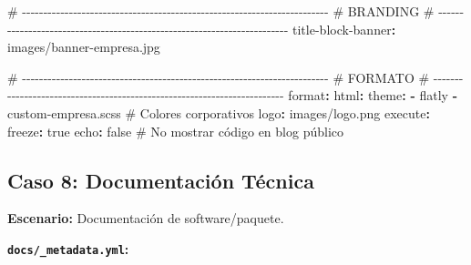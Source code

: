 \documentclass[
  doc,
  floatsintext,
  longtable,
  a4paper,
  nolmodern,
  notxfonts,
  notimes,
  12pt,
  colorlinks=true,linkcolor=blue,citecolor=blue,urlcolor=blue]{apa7}
\newenvironment{Shaded}{\begin{snugshade}}{\end{snugshade}}
\newcommand{\AttributeTok}[1]{\textcolor[rgb]{0.40,0.45,0.13}{#1}}
\newcommand{\CharTok}[1]{\textcolor[rgb]{0.13,0.47,0.30}{#1}}
\newcommand{\CommentTok}[1]{\textcolor[rgb]{0.37,0.37,0.37}{#1}}
\newcommand{\FunctionTok}[1]{\textcolor[rgb]{0.28,0.35,0.67}{#1}}
\newcommand{\KeywordTok}[1]{\textcolor[rgb]{0.00,0.23,0.31}{\textbf{#1}}}
\begin{document}
\begin{Shaded}
\begin{Highlighting}[]
\CommentTok{\# {-}{-}{-}{-}{-}{-}{-}{-}{-}{-}{-}{-}{-}{-}{-}{-}{-}{-}{-}{-}{-}{-}{-}{-}{-}{-}{-}{-}{-}{-}{-}{-}{-}{-}{-}{-}{-}{-}{-}{-}{-}{-}{-}{-}{-}{-}{-}{-}{-}{-}{-}{-}{-}{-}{-}{-}{-}{-}{-}{-}{-}{-}{-}{-}{-}{-}{-}{-}{-}{-}{-}{-}}
\CommentTok{\# BRANDING}
\CommentTok{\# {-}{-}{-}{-}{-}{-}{-}{-}{-}{-}{-}{-}{-}{-}{-}{-}{-}{-}{-}{-}{-}{-}{-}{-}{-}{-}{-}{-}{-}{-}{-}{-}{-}{-}{-}{-}{-}{-}{-}{-}{-}{-}{-}{-}{-}{-}{-}{-}{-}{-}{-}{-}{-}{-}{-}{-}{-}{-}{-}{-}{-}{-}{-}{-}{-}{-}{-}{-}{-}{-}{-}{-}}
\FunctionTok{title{-}block{-}banner}\KeywordTok{:}\AttributeTok{ images/banner{-}empresa.jpg}

\CommentTok{\# {-}{-}{-}{-}{-}{-}{-}{-}{-}{-}{-}{-}{-}{-}{-}{-}{-}{-}{-}{-}{-}{-}{-}{-}{-}{-}{-}{-}{-}{-}{-}{-}{-}{-}{-}{-}{-}{-}{-}{-}{-}{-}{-}{-}{-}{-}{-}{-}{-}{-}{-}{-}{-}{-}{-}{-}{-}{-}{-}{-}{-}{-}{-}{-}{-}{-}{-}{-}{-}{-}{-}{-}}
\CommentTok{\# FORMATO}
\CommentTok{\# {-}{-}{-}{-}{-}{-}{-}{-}{-}{-}{-}{-}{-}{-}{-}{-}{-}{-}{-}{-}{-}{-}{-}{-}{-}{-}{-}{-}{-}{-}{-}{-}{-}{-}{-}{-}{-}{-}{-}{-}{-}{-}{-}{-}{-}{-}{-}{-}{-}{-}{-}{-}{-}{-}{-}{-}{-}{-}{-}{-}{-}{-}{-}{-}{-}{-}{-}{-}{-}{-}{-}{-}}
\FunctionTok{format}\KeywordTok{:}
\AttributeTok{  }\FunctionTok{html}\KeywordTok{:}
\AttributeTok{    }\FunctionTok{theme}\KeywordTok{:}
\AttributeTok{      }\KeywordTok{{-}}\AttributeTok{ flatly}
\AttributeTok{      }\KeywordTok{{-}}\AttributeTok{ custom{-}empresa.scss}\CommentTok{  \# Colores corporativos}
\AttributeTok{    }\FunctionTok{logo}\KeywordTok{:}\AttributeTok{ images/logo.png}
\AttributeTok{    }
\FunctionTok{execute}\KeywordTok{:}
\AttributeTok{  }\FunctionTok{freeze}\KeywordTok{:}\AttributeTok{ }\CharTok{true}
\AttributeTok{  }\FunctionTok{echo}\KeywordTok{:}\AttributeTok{ }\CharTok{false}\CommentTok{               \# No mostrar código en blog público}
\end{Highlighting}
\end{Shaded}

\subsection{Caso 8: Documentación
Técnica}\label{caso-8-documentaciuxf3n-tuxe9cnica}

\textbf{Escenario:} Documentación de software/paquete.

\textbf{\texttt{docs/\_metadata.yml}:}
\end{document}
